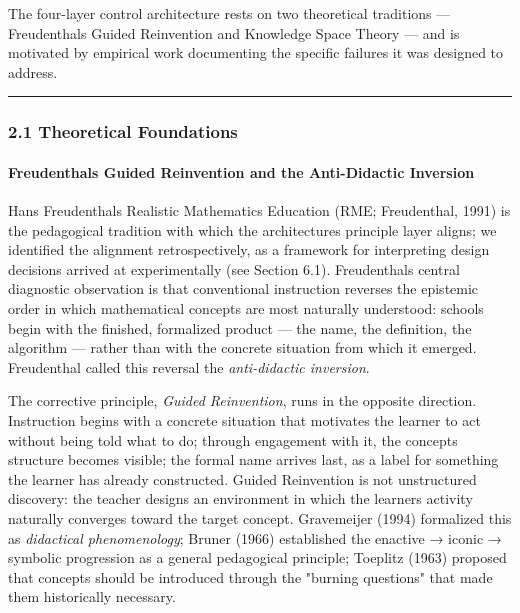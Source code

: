 \documentclass[
]{article}
\begin{document}
The four-layer control architecture rests on two theoretical traditions --- Freudenthal\textquotesingle s Guided Reinvention and Knowledge Space Theory --- and is motivated by empirical work documenting the specific failures it was designed to address.

\begin{center}\rule{0.5\linewidth}{0.5pt}\end{center}

\subsubsection{2.1 Theoretical Foundations}\label{21-theoretical-foundations}

\paragraph{Freudenthal\textquotesingle s Guided Reinvention and the Anti-Didactic Inversion}\label{freudenthals-guided-reinvention-and-the-anti-didactic-inversion}

Hans Freudenthal\textquotesingle s Realistic Mathematics Education (RME; Freudenthal, 1991) is the pedagogical tradition with which the architecture\textquotesingle s principle layer aligns; we identified the alignment retrospectively, as a framework for interpreting design decisions arrived at experimentally (see Section 6.1). Freudenthal\textquotesingle s central diagnostic observation is that conventional instruction reverses the epistemic order in which mathematical concepts are most naturally understood: schools begin with the finished, formalized product --- the name, the definition, the algorithm --- rather than with the concrete situation from which it emerged. Freudenthal called this reversal the \emph{anti-didactic inversion}.

The corrective principle, \emph{Guided Reinvention}, runs in the opposite direction. Instruction begins with a concrete situation that motivates the learner to act without being told what to do; through engagement with it, the concept\textquotesingle s structure becomes visible; the formal name arrives last, as a label for something the learner has already constructed. Guided Reinvention is not unstructured discovery: the teacher designs an environment in which the learner\textquotesingle s activity naturally converges toward the target concept. Gravemeijer (1994) formalized this as \emph{didactical phenomenology}; Bruner (1966) established the enactive → iconic → symbolic progression as a general pedagogical principle; Toeplitz (1963) proposed that concepts should be introduced through the "burning questions" that made them historically necessary.
\end{document}

